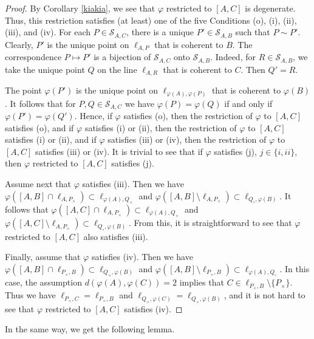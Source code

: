 \documentclass[10pt]{amsart}
\theoremstyle{definition}
\theoremstyle{remark}
\numberwithin{subsection}{section}
\numberwithin{equation}{section}
\begin{document}
\begin{proof}
By Corollary \ref{kiakia}, we see that $\varphi$ restricted to $[A, C]$ is degenerate. Thus, this restriction satisfies (at least) one of the five Conditions (o), (i), (ii), (iii), and (iv). For each $P \in \mathcal{S}_{A,C}$, there is a unique $P' \in \mathcal{S}_{A,B}$ such that $P \sim P'$. Clearly, $P'$ is the unique point on $\ell_{A,P}$ that is coherent to $B$. The correspondence $P \mapsto P'$ is a bijection of  
$ \mathcal{S}_{A,C}$ onto $ \mathcal{S}_{A,B}$. 
Indeed, for $R\in \mathcal{S}_{A,B}$, we take the unique point $Q$ on the line $\ell_{A,R}$ that is coherent to $C$. Then $Q' = R$.

The point $\varphi (P')$ is the unique point on $\ell_{\varphi (A), \varphi (P)}$ that is coherent to $\varphi (B)$. It follows that for $P,Q \in \mathcal{S}_{A,C}$ we have $\varphi (P) = \varphi (Q)$ if and only if 
$\varphi (P') = \varphi (Q')$. Hence, if $\varphi$ satisfies (o), then the restriction of $\varphi$ to $[A,C]$ satisfies (o), and if $\varphi$ satisfies (i) or (ii), then the restriction of $\varphi$ to $[A,C]$ satisfies (i) or (ii), and
if $\varphi$ satisfies (iii) or (iv), then the restriction of $\varphi$ to $[A,C]$ satisfies (iii) or (iv). It is trivial to see that if $\varphi$ satisfies (j), $j \in \{ i, ii \}$, then $\varphi$ restricted to $[A,C]$ satisfies (j).

Assume next that $\varphi$ satisfies (iii). 
Then we have $\varphi([A, B]\cap\ell_{A, P_\times})\subset \ell_{\varphi(A), Q_\times}$ and $\varphi([A, B]\setminus\ell_{A, P_\times})\subset \ell_{Q_\circ, \varphi(B)}$.
It follows that $\varphi([A, C]\cap\ell_{A, P_\times})\subset \ell_{\varphi(A), Q_\times}$ and $\varphi([A, C]\setminus\ell_{A, P_\times})\subset \ell_{Q_\circ, \varphi(B)}$.
From this, it is straightforward to see that $\varphi$ restricted to $[A,C]$ also satisfies (iii).

Finally, assume that $\varphi$ satisfies (iv). 
Then we have $\varphi([A, B]\cap\ell_{P_\times, B})\subset \ell_{Q_\times, \varphi(B)}$ and $\varphi([A, B]\setminus\ell_{P_\times, B})\subset \ell_{\varphi(A), Q_\circ}$.
In this case, the assumption $d(\varphi(A), \varphi(C))=2$ implies that $C\in \ell_{P_\times, B}\setminus\{P_\times\}$. 
Thus we have $\ell_{P_\times, C}=\ell_{P_\times, B}$ and $\ell_{Q_\times, \varphi(C)}=\ell_{Q_\times, \varphi(B)}$, and it is not hard to see that $\varphi$ restricted to $[A,C]$ satisfies (iv).
\end{proof}

In the same way, we get the following lemma.
\end{document}
